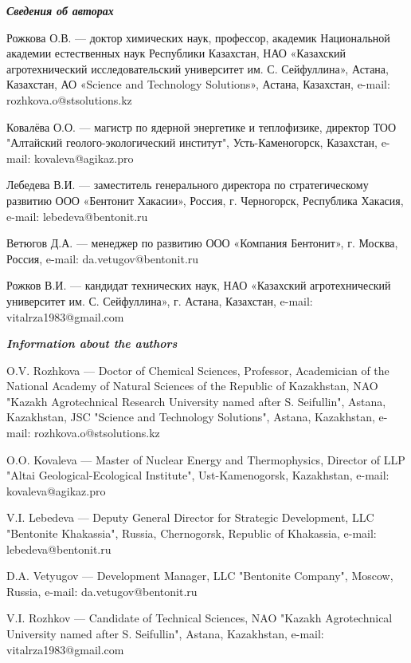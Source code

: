 \begin{authorinfo}
\emph{{\bfseries Сведения об авторах}}  

Рожкова О.В. — доктор химических наук, профессор, академик
Национальной академии естественных наук Республики Казахстан, НАО
«Казахский агротехнический исследовательский университет
им. С. Сейфуллина», Астана, Казахстан, АО «Science and Technology
Solutions», Астана, Казахстан, e-mail: rozhkova.o@stsolutions.kz

Ковалёва О.О. — магистр по ядерной энергетике и теплофизике, директор
ТОО "Алтайский геолого-экологический институт", Усть-Каменогорск,
Казахстан, e-mail: kovaleva@agikaz.pro

Лебедева В.И. — заместитель генерального директора по стратегическому
развитию ООО «Бентонит Хакасии», Россия, г. Черногорск, Республика
Хакасия, e-mail: lebedeva@bentonit.ru

Ветюгов Д.А. — менеджер по развитию ООО «Компания Бентонит»,
г. Москва, Россия, e-mail: da.vetugov@bentonit.ru

Рожков В.И. — кандидат технических наук, НАО «Казахский
агротехнический университет им. С. Сейфуллина», г. Астана, Казахстан,
e-mail: vitalrza1983@gmail.com

\emph{{\bfseries Information about the authors}}  

O.V. Rozhkova — Doctor of Chemical Sciences, Professor, Academician of
the National Academy of Natural Sciences of the Republic of
Kazakhstan, NAO "Kazakh Agrotechnical Research University named after
S. Seifullin", Astana, Kazakhstan, JSC "Science and Technology
Solutions", Astana, Kazakhstan, e-mail: rozhkova.o@stsolutions.kz

O.O. Kovaleva — Master of Nuclear Energy and Thermophysics, Director
of LLP "Altai Geological-Ecological Institute", Ust-Kamenogorsk,
Kazakhstan, e-mail: kovaleva@agikaz.pro

V.I. Lebedeva — Deputy General Director for Strategic Development, LLC
"Bentonite Khakassia", Russia, Chernogorsk, Republic of Khakassia,
e-mail: lebedeva@bentonit.ru

D.A. Vetyugov — Development Manager, LLC "Bentonite Company", Moscow,
Russia, e-mail: da.vetugov@bentonit.ru

V.I. Rozhkov — Candidate of Technical Sciences, NAO "Kazakh
Agrotechnical University named after S. Seifullin", Astana,
Kazakhstan, e-mail: vitalrza1983@gmail.com
\end{authorinfo}
